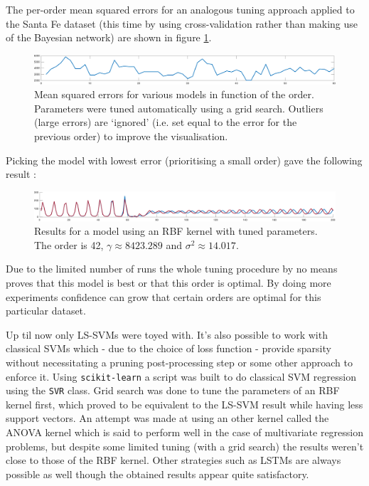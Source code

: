 
The per-order mean squared errors for an analogous tuning approach applied to the Santa Fe dataset (this time by using cross-validation rather than making use of the Bayesian network) are shown in figure \ref{santafeord}.

\begin{figure}[!h]
\centering
\includegraphics[width=\textwidth]{../src/figures/santafe/mseval}
\caption{Mean squared errors for various models in function of the order. Parameters were tuned automatically using a grid search. Outliers (large errors) are `ignored' (i.e. set equal to the error for the previous order) to improve the visualisation.}
\label{santafeord}
\end{figure}

Picking the model with lowest error (prioritising a small order) gave the following result :

\begin{figure}[!h]
\centering
\includegraphics[width=\textwidth]{../src/figures/santafe/final}
\caption{Results for a model using an RBF kernel with tuned parameters. The order is 42, $\gamma\approx 8423.289$ and $\sigma^2\approx 14.017$.}
\label{santafefinal}
\end{figure}

Due to the limited number of runs the whole tuning procedure by no means proves that this model is best or that this order is optimal. By doing more experiments confidence can grow that certain orders are optimal for this particular dataset. 

\par Up til now only LS-SVMs were toyed with. It's also possible to work with classical SVMs which - due to the choice of loss function - provide sparsity without necessitating a pruning post-processing step or some other approach to enforce it. Using \texttt{scikit-learn} a script was built to do classical SVM regression using the \texttt{SVR} class. Grid search was done to tune the parameters of an RBF kernel first, which proved to be equivalent to the LS-SVM result while having less support vectors. An attempt was made at using an other kernel called the ANOVA kernel which is said to perform well in the case of multivariate regression problems, but despite some limited tuning (with a grid search) the results weren't close to those of the RBF kernel. Other strategies such as LSTMs are always possible as well though the obtained results appear quite satisfactory.